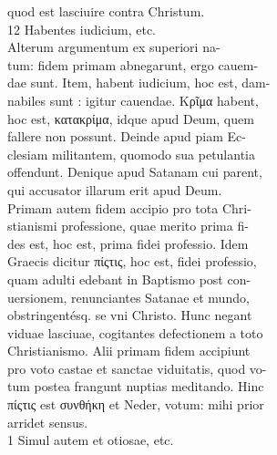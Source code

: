 \documentclass{article}
\begin{document}
\begin{pages}
                quod est lasciuire contra Christum. \\
                12 Habentes iudicium, etc. \\
                Alterum argumentum ex superiori na- \\
                tum: fidem primam abnegarunt, ergo cauem- \\
                dae sunt. Item, habent iudicium, hoc est, dam- \\
                nabiles sunt : igitur cauendae. Κρῖμα habent, \\
                hoc est, κατακρίμα, idque apud Deum, quem \\
                fallere non possunt. Deinde apud piam Ec- \\
                clesiam militantem, quomodo sua petulantia \\
                offendunt. Denique apud Satanam cui parent, \\
                qui accusator illarum erit apud Deum. \\
                Primam autem fidem accipio pro tota Chri- \\
                stianismi professione, quae merito prima fi- \\
                des est, hoc est, prima fidei professio. Idem \\
                Graecis dicitur πίςτις, hoc est, fidei professio, \\
                quam adulti edebant in Baptismo post con- \\
                uersionem, renunciantes Satanae et mundo, \\
                obstringentésq. se vni Christo. Hunc negant \\
                viduae lasciuae, cogitantes defectionem a toto \\
                Christianismo. Alii primam fidem accipiunt \\
                pro voto castae et sanctae viduitatis, quod vo- \\
                tum postea frangunt nuptias meditando. Hinc \\
                πίςτις est συνθήκη et Neder, votum: mihi prior \\
                arridet sensus. \\
                1 Simul autem et otiosae, etc. \\

\end{pages}
\end{document}
